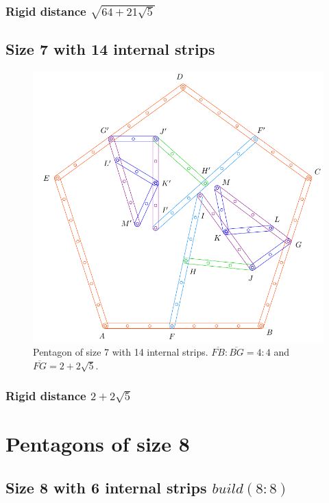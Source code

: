 \documentclass[11pt]{article}
\begin{document}
\subsubsection{Rigid distance $\sqrt{64 + 21\sqrt5}$}

\subsection{Size 7 with 14 internal strips}

\begin{figure}[H]
\centering
\includegraphics[scale=0.8]{7/penta7-14a}
\caption{Pentagon of size 7 with 14 internal strips. $\overline{FB} : \overline{BG} = 4:4$ and $\overline{FG} = 2 + 2\sqrt5$.}
\label{fig:penta7-14a}
\end{figure}
%
\subsubsection{Rigid distance $2 + 2\sqrt5$}



\section{Pentagons of size 8}

\subsection{Size 8 with 6 internal strips $build(8:8)$}
\end{document}
